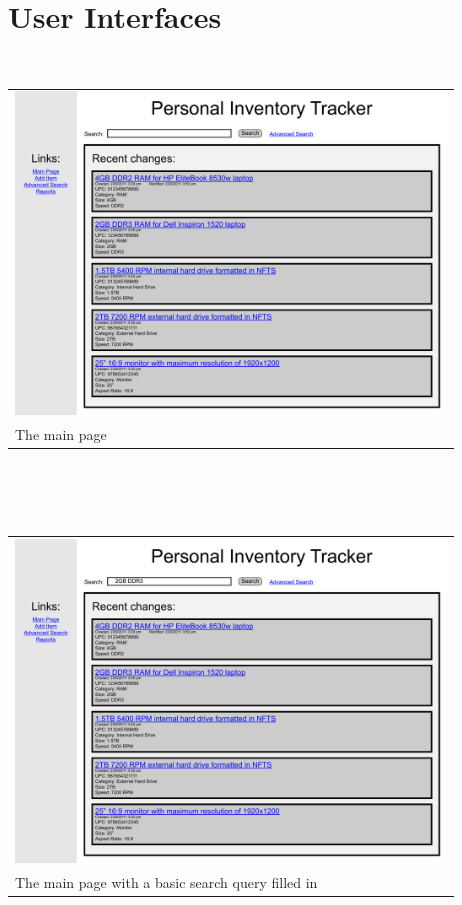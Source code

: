\documentclass{article}
\begin{document}
\section{User Interfaces}
\graphicspath{{../StoryboardImages/}}
~\\
\begin{tabular}{ p{4.5in} }
\includegraphics[keepaspectratio, width=4.5in]{addItemF0S0.pdf}\\
The main page
\end{tabular}\\
~\\
~\\
\begin{tabular}{ p{4.5in} }
\includegraphics[keepaspectratio, width=4.5in]{basicSearchF0S0.pdf} \\
The main page with a basic search query filled in
\end{tabular}\\
~\\
\end{document}
